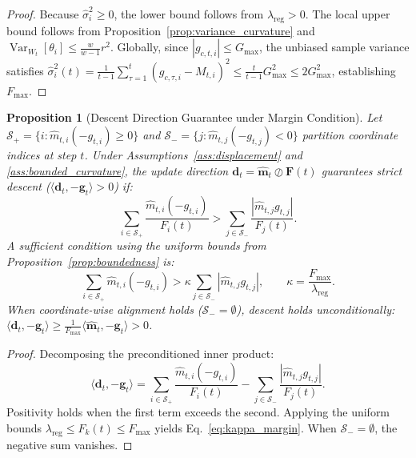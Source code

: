 \documentclass[sn-mathphys,Numbered]{sn-jnl}
\theoremstyle{thmstyleone}
\newtheorem{proposition}{Proposition}
\theoremstyle{thmstyletwo}
\theoremstyle{thmstylethree}
\begin{document}
\begin{proof}
Because $\hat{\sigma}_i^2 \ge 0$, the lower bound follows from $\lambda_{\text{reg}} > 0$. The local upper bound follows from Proposition~\ref{prop:variance_curvature} and $\operatorname{Var}_{W_t}[\theta_i] \le \frac{w}{w-1} r^2$. Globally, since $|g_{c,t,i}| \le G_{\max}$, the unbiased sample variance satisfies $\hat{\sigma}_i^2(t) = \frac{1}{t-1}\sum_{\tau=1}^t (g_{c,\tau,i} - M_{t,i})^2 \le \frac{t}{t-1} G_{\max}^2 \le 2 G_{\max}^2$, establishing $F_{\max}$.
\end{proof}

\begin{proposition}[Descent Direction Guarantee under Margin Condition]
\label{prop:descent}
Let $\mathcal{S}_+ = \{i : \hat{m}_{t,i}(-g_{t,i}) \ge 0\}$ and $\mathcal{S}_- = \{j : \hat{m}_{t,j}(-g_{t,j}) < 0\}$ partition coordinate indices at step $t$. Under Assumptions~\ref{ass:displacement} and \ref{ass:bounded_curvature}, the update direction $\mathbf{d}_t = \hat{\mathbf{m}}_t \oslash \mathbf{F}(t)$ guarantees strict descent ($\langle \mathbf{d}_t, -\mathbf{g}_t \rangle > 0$) if:
\begin{equation}
\sum_{i \in \mathcal{S}_+} \frac{\hat{m}_{t,i} (-g_{t,i})}{F_i(t)} > \sum_{j \in \mathcal{S}_-} \frac{|\hat{m}_{t,j} g_{t,j}|}{F_j(t)}.
\label{eq:margin_condition}
\end{equation}
A sufficient condition using the uniform bounds from Proposition~\ref{prop:boundedness} is:
\begin{equation}
\sum_{i \in \mathcal{S}_+} \hat{m}_{t,i} (-g_{t,i}) > \kappa \sum_{j \in \mathcal{S}_-} |\hat{m}_{t,j} g_{t,j}|, \qquad \kappa = \frac{F_{\max}}{\lambda_{\text{reg}}}.
\label{eq:kappa_margin}
\end{equation}
When coordinate-wise alignment holds ($\mathcal{S}_- = \emptyset$), descent holds unconditionally: $\langle \mathbf{d}_t, -\mathbf{g}_t \rangle \ge \frac{1}{F_{\max}} \langle \hat{\mathbf{m}}_t, -\mathbf{g}_t \rangle > 0$.
\end{proposition}

\begin{proof}
Decomposing the preconditioned inner product:
\begin{equation}
\langle \mathbf{d}_t, -\mathbf{g}_t \rangle = \sum_{i \in \mathcal{S}_+} \frac{\hat{m}_{t,i}(-g_{t,i})}{F_i(t)} - \sum_{j \in \mathcal{S}_-} \frac{|\hat{m}_{t,j} g_{t,j}|}{F_j(t)}.
\end{equation}
Positivity holds when the first term exceeds the second. Applying the uniform bounds $\lambda_{\text{reg}} \le F_k(t) \le F_{\max}$ yields Eq.~\eqref{eq:kappa_margin}. When $\mathcal{S}_- = \emptyset$, the negative sum vanishes.
\end{proof}
\end{document}
